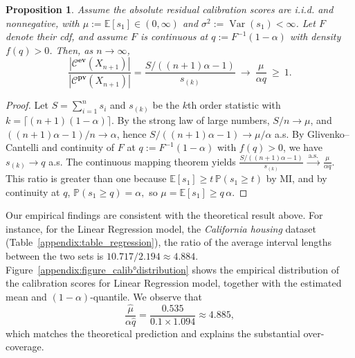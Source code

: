 \documentclass{article}
\theoremstyle{plain}
\newtheorem{proposition}[theorem]{Proposition}
\theoremstyle{definition}
\theoremstyle{remark}
\begin{document}
\begin{proposition}

Assume the absolute residual calibration scores are i.i.d. and nonnegative, with
$\mu := \mathbb{E}[s_1] \in (0, \infty)$ and $\sigma^2 := \operatorname{Var}(s_1) < \infty$.
Let $F$ denote their cdf, and assume $F$ is continuous at
$q := F^{-1}(1-\alpha)$ with density $f(q) > 0$.
Then, as $n \to \infty$,
\[
\frac{|\mathcal{C}^{\mathbf{ev}}(X_{n+1})|}{|\mathcal{C}^{\mathbf{pv}}(X_{n+1})|}=\frac{S/((n+1)\alpha-1)}{s_{(k)}}\ \longrightarrow\ \frac{\mu}{\alpha q}\ \ge\ 1.
\]
\end{proposition}
\begin{proof}
Let $S=\sum_{i=1}^n s_i$ and $s_{(k)}$ be the $k$th order statistic with $k=\lceil (n+1)(1-\alpha)\rceil$. By the strong law of large numbers, $S/n\to\mu$, and $((n+1)\alpha-1)/n\to \alpha$, hence $S/((n+1)\alpha-1)\to \mu/\alpha$ a.s. By Glivenko--Cantelli and continuity of $F$ at $q:=F^{-1}(1-\alpha)$ with $f(q)>0$, we have $s_{(k)}\to q$ a.s. The continuous mapping theorem yields $\frac{S/((n+1)\alpha-1)}{s_{(k)}}\ \xrightarrow{\text{a.s.}}\ \frac{\mu}{\alpha q}.$ This ratio is greater than one because
$\mathbb{E}[s_1]\ge t\,\mathbb{P}(s_1\ge t)$ by MI, and by continuity at $q$, $\mathbb{P}(s_1\ge q)=\alpha,$ so $  \mu=\mathbb{E}[s_1]\ge q\,\alpha$.
\end{proof}

Our empirical findings are consistent with the theoretical result above. For instance, for the Linear Regression model, the \emph{California housing} dataset (Table~\ref{appendix:table_regression}), the ratio of the average interval lengths between the two sets is $10.717/2.194 \approx4.884$. Figure~\ref{appendix:figure_calib°distribution} shows the empirical distribution of the calibration scores for Linear Regression model, together with the estimated mean and $(1-\alpha)$-quantile. We observe that
\[
\frac{\hat{\mu}}{\alpha \hat{q}} = \frac{0.535}{0.1\times1.094} \approx 4.885,
\]
which matches the theoretical prediction and explains the substantial over-coverage.



\end{document}
